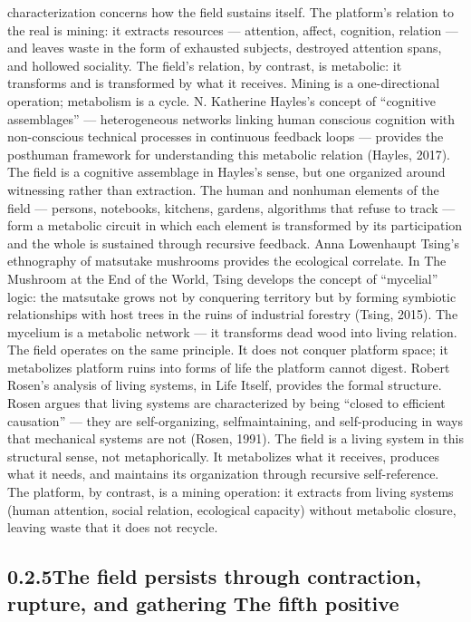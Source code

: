 characterization concerns how the field sustains itself. The platform’s relation to the real is mining: it extracts resources — attention, affect, cognition, relation — and leaves waste in the form of exhausted subjects, destroyed attention spans, and hollowed sociality. The field’s relation, by contrast, is metabolic: it transforms and is transformed by what it receives. Mining is a one-directional operation; metabolism is a cycle. N. Katherine Hayles’s concept of “cognitive assemblages” — heterogeneous networks linking human conscious cognition with non-conscious technical processes in continuous feedback loops — provides the posthuman framework for understanding this metabolic relation (Hayles, 2017). The field is a cognitive assemblage in Hayles’s sense, but one organized around witnessing rather than extraction. The human and nonhuman elements of the field — persons, notebooks, kitchens, gardens, algorithms that refuse to track — form a metabolic circuit in which each element is transformed by its participation and the whole is sustained through recursive feedback. Anna Lowenhaupt Tsing’s ethnography of matsutake mushrooms provides the ecological correlate. In The Mushroom at the End of the World, Tsing develops the concept of “mycelial” logic: the matsutake grows not by conquering territory but by forming symbiotic relationships with host trees in the ruins of industrial forestry (Tsing, 2015). The mycelium is a metabolic network — it transforms dead wood into living relation. The field operates on the same principle. It does not conquer platform space; it metabolizes platform ruins into forms of life the platform cannot digest. Robert Rosen’s analysis of living systems, in Life Itself, provides the formal structure. Rosen argues that living systems are characterized by being “closed to efficient causation” — they are self-organizing, selfmaintaining, and self-producing in ways that mechanical systems are not (Rosen, 1991). The field is a living system in this structural sense, not metaphorically. It metabolizes what it receives, produces what it needs, and maintains its organization through recursive self-reference. The platform, by contrast, is a mining operation: it extracts from living systems (human attention, social relation, ecological capacity) without metabolic closure, leaving waste that it does not recycle.

\subsection{0.2.5\quad The field persists through contraction, rupture, and gathering The fifth positive}

